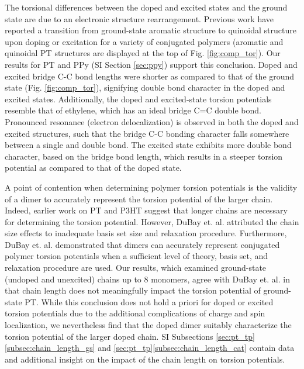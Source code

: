 The torsional differences between the doped and excited states and the ground state are due to an electronic structure rearrangement. Previous work have reported a transition from ground-state aromatic structure to quinoidal structure upon doping or excitation for a variety of conjugated polymers (aromatic and quinoidal PT structures are displayed at the top of Fig. \ref{fig:comp_tor}).\cite{Roth2005, Burrezo2017, Wells2008, Aime1989, Banerji2011, Roseli2017, Busby2011, Yu2014, Fonner2010, Baitoul2000, Bradley1989} Our results for PT and PPy (SI Section \ref{sec:ppy}) support this conclusion. Doped and excited bridge C-C bond lengths were shorter as compared to that of the ground state (Fig. \ref{fig:comp_tor}), signifying double bond character in the doped and excited states. Additionally, the doped and excited-state torsion potentials resemble that of ethylene, which has an ideal bridge C=C double bond.\cite{Shao2003} Pronounced resonance (electron delocalization) is observed in both the doped and excited structures, such that the bridge C-C bonding character falls somewhere between a single and double bond. The excited state exhibits more double bond character, based on the bridge bond length, which results in a steeper torsion potential as compared to that of the doped state.

A point of contention when determining polymer torsion potentials is the validity of a dimer to accurately represent the torsion potential of the larger chain. Indeed, earlier work on PT and P3HT suggest that longer chains are necessary for determining the torsion potential.\cite{Darling2009} However, DuBay et. al. attributed the chain size effects to inadequate basis set size and relaxation procedure. Furthermore, DuBay et. al. demonstrated that dimers can accurately represent conjugated polymer torsion potentials when a sufficient level of theory, basis set, and relaxation procedure are used.\cite{Dubay2012} Our results, which examined ground-state (undoped and unexcited) chains up to 8 monomers, agree with DuBay et. al. in that chain length does not meaningfully impact the torsion potential of ground-state PT. While this conclusion does not hold a priori for doped or excited torsion potentials due to the additional complications of charge and spin localization, we nevertheless find that the doped dimer suitably characterize the torsion potential of the larger doped chain. SI Subsections \ref{sec:pt_tp}\ref{subsec:chain_length_gs} and \ref{sec:pt_tp}\ref{subsec:chain_length_cat} contain data and additional insight on the impact of the chain length on torsion potentials.

